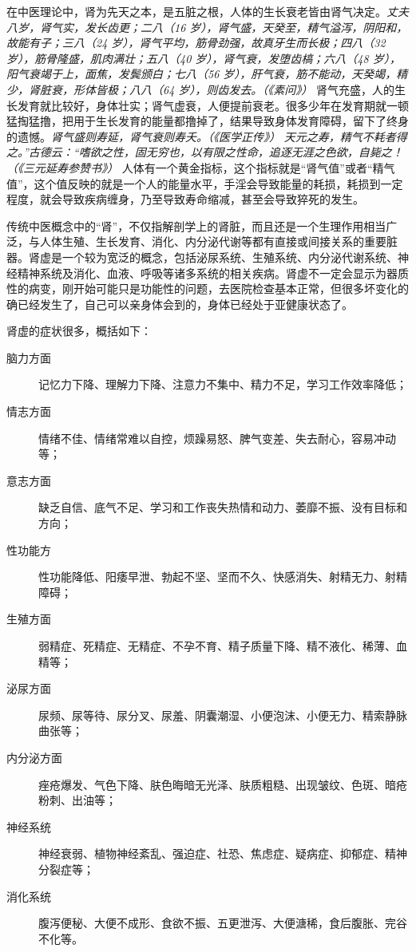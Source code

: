 在中医理论中，肾为先天之本，是五脏之根，人体的生长衰老皆由肾气决定。\textit{丈夫八岁，肾气实，发长齿更；二八（16 岁），肾气盛，天癸至，精气溢泻，阴阳和，故能有子；三八（24 岁），肾气平均，筋骨劲强，故真牙生而长极；四八（32 岁），筋骨隆盛，肌肉满壮；五八（40 岁），肾气衰，发堕齿槁；六八（48 岁），阳气衰竭于上，面焦，发鬓颁白；七八（56 岁），肝气衰，筋不能动，天癸竭，精少，肾脏衰，形体皆极；八八（64 岁），则齿发去。（《素问》）} 肾气充盛，人的生长发育就比较好，身体壮实；肾气虚衰，人便提前衰老。很多少年在发育期就一顿猛掏猛撸，把用于生长发育的能量都撸掉了，结果导致身体发育障碍，留下了终身的遗憾。\textit{肾气盛则寿延，肾气衰则寿夭。（《医学正传》）} \textit{天元之寿，精气不耗者得之。”古德云：“嗜欲之性，固无穷也，以有限之性命，追逐无涯之色欲，自毙之！（《三元延寿参赞书》）} 人体有一个黄金指标，这个指标就是“肾气值”或者“精气值”，这个值反映的就是一个人的能量水平，手淫会导致能量的耗损，耗损到一定程度，就会导致疾病缠身，乃至导致寿命缩减，甚至会导致猝死的发生。

传统中医概念中的“肾”，不仅指解剖学上的肾脏，而且还是一个生理作用相当广泛，与人体生殖、生长发育、消化、内分泌代谢等都有直接或间接关系的重要脏器。肾虚是一个较为宽泛的概念，包括泌尿系统、生殖系统、内分泌代谢系统、神经精神系统及消化、血液、呼吸等诸多系统的相关疾病。肾虚不一定会显示为器质性的病变，刚开始可能只是功能性的问题，去医院检查基本正常，但很多坏变化的确已经发生了，自己可以亲身体会到的，身体已经处于亚健康状态了。

肾虚的症状很多，概括如下：

\begin{description}
    \item[脑力方面] 记忆力下降、理解力下降、注意力不集中、精力不足，学习工作效率降低；
    \item[情志方面] 情绪不佳、情绪常难以自控，烦躁易怒、脾气变差、失去耐心，容易冲动等；
    \item[意志方面] 缺乏自信、底气不足、学习和工作丧失热情和动力、萎靡不振、没有目标和方向；
    \item[性功能方] 性功能降低、阳痿早泄、勃起不坚、坚而不久、快感消失、射精无力、射精障碍；
    \item[生殖方面] 弱精症、死精症、无精症、不孕不育、精子质量下降、精不液化、稀薄、血精等；
    \item[泌尿方面] 尿频、尿等待、尿分叉、尿羞、阴囊潮湿、小便泡沫、小便无力、精索静脉曲张等；
    \item[内分泌方面] 痤疮爆发、气色下降、肤色晦暗无光泽、肤质粗糙、出现皱纹、色斑、暗疮粉刺、出油等；
    \item[神经系统] 神经衰弱、植物神经紊乱、强迫症、社恐、焦虑症、疑病症、抑郁症、精神分裂症等；
    \item[消化系统] 腹泻便秘、大便不成形、食欲不振、五更泄泻、大便溏稀，食后腹胀、完谷不化等。
\end{description}

